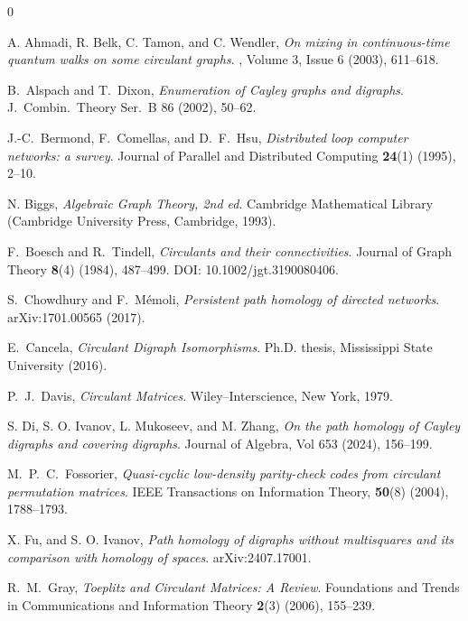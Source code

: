\documentclass[11pt]{amsart}
\theoremstyle{plain}
\theoremstyle{definition}
\numberwithin{equation}{section}
\begin{document}
\begin{thebibliography}{0}

 A. Ahmadi, R. Belk, C. Tamon, and C. Wendler,
\textit{On mixing in continuous-time quantum walks on some circulant graphs}.
, Volume 3, Issue 6 (2003), 611--618.

B.~Alspach and T.~Dixon,
\textit{Enumeration of Cayley graphs and digraphs}.
J.\ Combin.\ Theory Ser.\ B 86 (2002), 50--62.




J.-C.~Bermond, F.~Comellas, and D.~F.~Hsu,
\textit{Distributed loop computer networks: a survey}. 
Journal of Parallel and Distributed Computing
\textbf{24}(1) (1995), 2--10.


 N. Biggs, 
\textit{Algebraic Graph Theory, 2nd ed}. 
Cambridge Mathematical Library (Cambridge University Press, Cambridge, 1993).

F.~Boesch and R.~Tindell,
\textit{Circulants and their connectivities}.
Journal of Graph Theory \textbf{8}(4) (1984), 487--499.
DOI: 10.1002/jgt.3190080406.


S.~Chowdhury and F.~M\'emoli,
\textit{Persistent path homology of directed networks}.
arXiv:1701.00565 (2017).

E.~Cancela,
\textit{Circulant Digraph Isomorphisms}.
Ph.D. thesis, Mississippi State University (2016).


P.~J.~Davis,
\textit{Circulant Matrices}.
Wiley--Interscience, New York, 1979.



 S. Di, S. O. Ivanov, L. Mukoseev, and M. Zhang,
\textit{On the path homology of Cayley digraphs and covering digraphs}.
Journal of Algebra, Vol 653 (2024), 156--199.

M.~P.~C.~Fossorier,
\textit{Quasi-cyclic low-density parity-check codes from circulant permutation matrices}.
IEEE Transactions on Information Theory, \textbf{50}(8) (2004), 1788--1793.


 X. Fu, and S. O. Ivanov,
\textit{Path homology of digraphs without multisquares and its comparison with homology of spaces}.
arXiv:2407.17001.


 R.~M.~Gray,
\textit{Toeplitz and Circulant Matrices: A Review}.
Foundations and Trends in Communications and Information Theory
\textbf{2}(3) (2006), 155--239.


\end{thebibliography}
\end{document}
